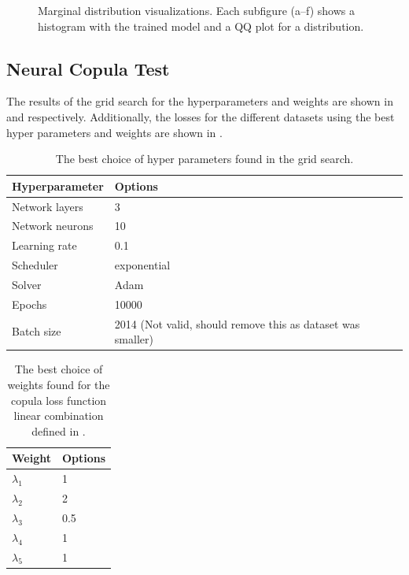 \begin{figure}
\begin{minipage}{0.45\textwidth}
\begin{minipage}{0.48\textwidth}
        \end{minipage}
    \end{minipage}

    \caption{Marginal distribution visualizations. Each subfigure (a--f) shows a histogram with the trained model and a QQ plot for a distribution.}
    \label{fig:MarginalResults}
\end{figure}


\subsection{Neural Copula Test}
The results of the grid search for the hyperparameters and weights are shown in  and  respectively. Additionally, the losses for the different datasets using the best hyper parameters and weights are shown in . 


\begin{table}[h!]
    \centering
    \caption{The best choice of hyper parameters found in the grid search.}
    \begin{tabular}{ll}
    \textbf{Hyperparameter} & \textbf{Options} \\
    \hline
    Network layers & 3 \\
    Network neurons & 10 \\
    Learning rate & 0.1 \\
    Scheduler & exponential \\
    Solver & Adam \\
    Epochs & 10000 \\
    Batch size & 2014 (Not valid, should remove this as dataset was smaller)\\
    \end{tabular}
    \label{tab:Best_hyperparams}
\end{table}
    
\begin{table}[h!]
    \centering
    \caption{The best choice of weights found for the copula loss function linear combination defined in .}
    \begin{tabular}{ll}
    \textbf{Weight} & \textbf{Options} \\
    \hline
    $\lambda_1$ & 1 \\
    $\lambda_2$ & 2 \\
    $\lambda_3$ & 0.5 \\
    $\lambda_4$ & 1 \\
    $\lambda_5$ & 1 \\
    \end{tabular}
    \label{tab:Best_weights}
\end{table}
    

